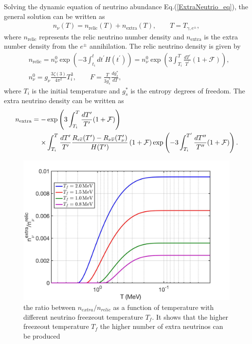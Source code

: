 Solving the dynamic equation of neutrino abundance Eq.(\ref{ExtraNeutrio_eq}), the general solution can be written as
\begin{align}
n_\nu(T)=n_\mathrm{relic}(T)+n_\mathrm{extra}(T),\qquad T=T_{\gamma,e^\pm},
\end{align}
where $n_\mathrm{relic}$ represents the relic neutrino number density and $n_\mathrm{extra}$ is the extra number density from the $e^\pm$ annihilation. The relic neutrino density is given by
\begin{align}  &n_\mathrm{relic}=n_\nu^0\exp\left(-3\int_{t_i}^t{dt^\prime}H(t^\prime)\right)=n_\nu^0\exp\left(3\int_{T_i}^T\frac{dT^\prime}{T^\prime}(1+\mathcal{F})\right),\\
&n^0_\nu=g_\nu\frac{3\zeta(3)}{4\pi^2}T^3_i,\qquad F=\frac{T}{3g^\ast_s}\frac{dg^\ast_s}{dT},
\end{align}
where $T_i$ is the initial temperature and $g^\ast_s$ is the entropy degrees of freedom. The extra neutrino density can be written as
\begin{align}
n_\mathrm{extra}=-&\exp\left(3\int_{T_i}^T\frac{dT^\prime}{T^\prime}(1+\mathcal{F})\right)\notag\\
\times&\int_{T_i}^T\frac{dT^\prime}{T^\prime}\frac{R_{e\overline{e}}(T^\prime)-R_{\nu\overline{\nu}}(T^\prime_\nu)}{H(T^\prime)}\left(1+\mathcal{F}\right)\exp\left(-3\int_{T_i}^{T^{\prime}}\frac{dT^{\prime\prime}}{T^{\prime\prime}}(1+\mathcal{F})\right).
\end{align}
\begin{figure}[ht]
\begin{center}
\includegraphics[width=\textwidth]{./plots/ExtraNeutrinoRatio}
\caption{the ratio between $n_{extra}/n_{relic}$ as a function of temperature with different neutrino freezeout temperature $T_f$. It shows that the higher freezeout temperature $T_f$ the higher number of extra neutrinos can be produced}
\label{ExtraNeutrinoRatio}
\end{center}
\end{figure}

